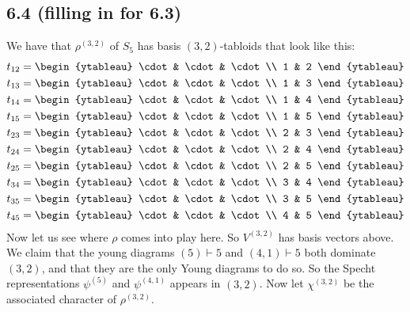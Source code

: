 \documentclass[]{article}
\begin{document}
\subsection*{6.4 (filling in for 6.3)}
We have that $\rho^{(3,2)}$ of $S_5$ has basis $(3,2)$-tabloids that look like this:
\begin{align*}
	t_{12} &= 
	\begin{ytableau}
		\cdot & \cdot & \cdot\\
		1 & 2
	\end{ytableau}\\
		t_{13} &= 
	\begin{ytableau}
		\cdot & \cdot & \cdot\\
		1 & 3
	\end{ytableau}\\
		t_{14} &= 
	\begin{ytableau}
		\cdot & \cdot & \cdot\\
		1 & 4
	\end{ytableau}\\
		t_{15} &= 
	\begin{ytableau}
		\cdot & \cdot & \cdot\\
		1 & 5
	\end{ytableau}\\
		t_{23} &= 
	\begin{ytableau}
		\cdot & \cdot & \cdot\\
		2 & 3
	\end{ytableau}\\
			t_{24} &= 
	\begin{ytableau}
		\cdot & \cdot & \cdot\\
		2 & 4
	\end{ytableau}\\
			t_{25} &= 
	\begin{ytableau}
		\cdot & \cdot & \cdot\\
		2 & 5
	\end{ytableau}\\
			t_{34} &= 
	\begin{ytableau}
		\cdot & \cdot & \cdot\\
		3 & 4
	\end{ytableau}\\
	t_{35} &= 
	\begin{ytableau}
		\cdot & \cdot & \cdot\\
		3 & 5
	\end{ytableau}\\
	t_{45} &= 
	\begin{ytableau}
		\cdot & \cdot & \cdot\\
		4 & 5
	\end{ytableau}\\
\end{align*}
Now let us see where $\rho$ comes into play here. So $V^{(3,2)}$ has basis vectors above. We claim that the young diagrams $(5) \vdash 5$ and $(4,1) \vdash 5$ both dominate $(3,2)$, and that they are the only Young diagrams to do so. So the Specht representations $\psi^{(5)}$ and $\psi^{(4,1)}$ appears in $(3,2)$. Now let $\chi^{(3,2)}$ be the associated character of $\rho^{(3,2)}$. 
\end{document}
